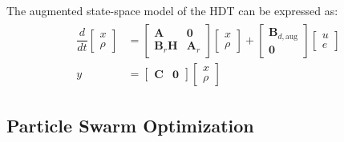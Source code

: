 The augmented state-space model of the HDT can be expressed as:
\begin{align}
    \begin{aligned}
        \dfrac{d}{dt}
        \begin{bmatrix}
            x\\
            \rho
        \end{bmatrix}
        &=
        \begin{bmatrix}
            \mathbf{A} & \mathbf{0} \\
            \mathbf{B}_r\mathbf{H} & \mathbf{A}_r
        \end{bmatrix}
        \begin{bmatrix}
            x\\
            \rho
        \end{bmatrix}
        +
        \begin{bmatrix}
            \mathbf{B}_{d,\text{aug}}\\
            \mathbf{0}
        \end{bmatrix}
        \begin{bmatrix}
            u\\
            e
        \end{bmatrix}
        \\
        y &= 
        \begin{bmatrix}
            \mathbf{C} & \mathbf{0}
        \end{bmatrix}
        \begin{bmatrix}
            x\\
            \rho
        \end{bmatrix}
    \end{aligned}
\end{align}

\subsection{Particle Swarm Optimization}

